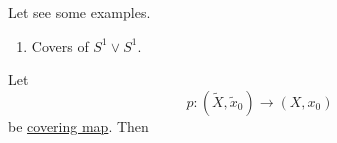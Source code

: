 \begin{eg}
	Let see some examples.
	\begin{enumerate}
		\item Covers of \(S^1\vee S^1\).
		      \begin{figure}[H]
			      \centering
			      \label{fig:eg:lec14:1}
		      \end{figure}
	\end{enumerate}
\end{eg}

\begin{proposition}
	Let
	\[
		p\colon (\widetilde{X} , \widetilde{x} _0)\to (X, x_0)
	\]
	be \hyperref[def:covering-space]{covering map}. Then
\end{proposition}
